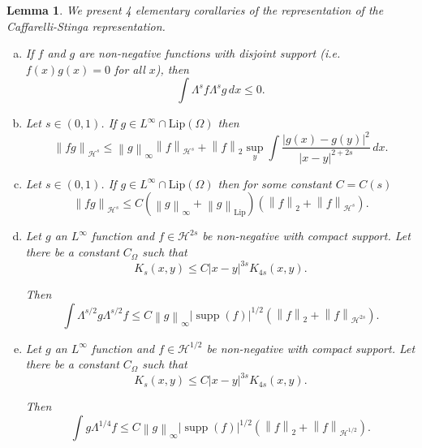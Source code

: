\documentclass[11pt]{amsart}
\newtheorem{lemma}[theorem]{Lemma}
\theoremstyle{remark}
\theoremstyle{definition}
\newcommand{\norm}[1]{\left\lVert#1\right\rVert}
\newcommand{\paren}[1]{\left( #1 \right)}
\DeclareMathOperator{\supp}{supp}
\newcommand{\Lip}{\text{Lip}}
\newcommand{\HD}{\mathcal{H}}
\newcommand{\Comega}{C_\Omega}
\begin{document}
\begin{lemma} \label{thm:Lambda stuff}
We present 4 elementary corallaries of the representation of the Caffarelli-Stinga representation.  

\begin{enumerate}[(a)]
\item \label{thm:disjoint} If $f$ and $g$ are non-negative functions with disjoint support (i.e. $f(x)g(x) = 0$ for all $x$), then 
\[ \int \Lambda^s f \Lambda^s g \,dx \leq 0. \]

\item \label{thm:product rule} Let $s \in (0,1)$.  If $g \in L^\infty \cap \Lip(\Omega)$ then
\[ \norm{fg}_{\HD^s} \leq \norm{g}_\infty \norm{f}_{\HD^s} + \norm{f}_2 \sup_y \int \frac{|g(x)-g(y)|^2}{|x-y|^{2+2s}} \,dx. \]

\item \label{thm:extra product rule} Let $s \in (0,1)$.  If $g \in L^\infty \cap \Lip(\Omega)$ then for some constant $C=C(s)$
\[  \norm{fg}_{\HD^s} \leq C \paren{\norm{g}_\infty + \norm{g}_\Lip} \paren{\norm{f}_2 + \norm{f}_{\HD^s}}. \]

\item \label{thm:L1 of Lambda bounded} Let $g$ an $L^\infty$ function and $f \in \HD^{2s}$ be non-negative with compact support.  Let there be a constant $\Comega$ such that
\begin{equation} \label{K bounded between orders} K_s(x,y) \leq C |x-y|^{3s} K_{4s}(x,y). \end{equation}

Then
\[ \int \Lambda^{s/2} g \Lambda^{s/2} f \leq C \norm{g}_\infty |\supp(f)|^{1/2} \paren{ \norm{f}_2 + \norm{f}_{\HD^{2s}}}. \]

\item \label{thm:L1 of Lambda1/4 bounded} Let $g$ an $L^\infty$ function and $f \in \HD^{1/2}$ be non-negative with compact support.  Let there be a constant $\Comega$ such that
\[ K_s(x,y) \leq C |x-y|^{3s} K_{4s}(x,y). \]

Then
\[ \int g \Lambda^{1/4} f \leq C \norm{g}_\infty |\supp(f)|^{1/2} \paren{ \norm{f}_2 + \norm{f}_{\HD^{1/2}}}. \]

\end{enumerate}
\end{lemma}
\end{document}
